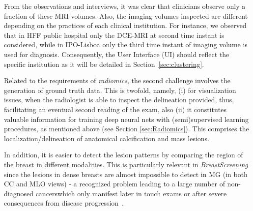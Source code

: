 
From the  observations and interviews, it was clear  that clinicians observe only a fraction of these MRI volumes.
Also, the imaging volumes inspected are different depending on the practices of each clinical institution.
For instance, we observed that in HFF public hospital only the DCE-MRI at second time instant is considered, while in IPO-Lisboa only the third time instant of imaging volume is used for diagnosis.
Consequently, the User Interface (UI) should reflect the specific institution as it will be detailed in Section~\ref{sec:clustering}.

Related to the requirements of {\it radiomics}, the second challenge involves the generation of ground truth data.
This is twofold, namely, (i) for visualization issues, when the radiologist is able to inspect the delineation provided, thus, facilitating an eventual second reading of the exam, also (ii) it constitutes valuable information for training deep neural nets with (semi)supervised learning procedures, as mentioned above (see Section \ref{sec:Radiomics}).
This comprises the localization/delineation of anatomical calcification and mass lesions.

In addition, it is easier to detect the lesion patterns by comparing the region of the breast in different modalities.
This is particularly relevant in {\it BreastScreening} since the lesions in dense breasts are almost impossible to detect in MG (in both CC and MLO views) - a recognized problem leading to a large number of non-diagnosed cancers\footnotemark[4] which only manifest later in touch exams or after severe consequences from disease progression~\cite{mohamed2018deep}.


